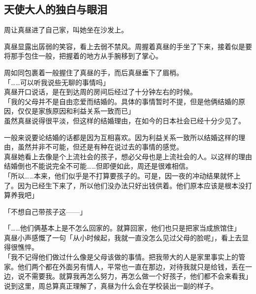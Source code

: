 \subsection{天使大人的独白与眼泪}

周让真昼进了自己家，叫她坐在沙发上。

真昼显露出孱弱的笑容，看上去弱不禁风。周握着真昼的手坐了下来，接着似是要将那手包住一般，把握着的地方从手腕移到了掌心。

周如同包裹着一般握住了真昼的手，而后真昼垂下了眉梢。\\

「……可以听我说些无聊的事情吗」\\

真昼开口说话，是在到达周的房间后经过了十分钟左右的时候。\\

「我的父母并不是自由恋爱而结婚的。具体的事情暂时不提，但是他俩结婚的原因，仅仅是家族原因和利益关系一致而已」\\

虽然真昼说得很平淡，但这样的结婚理由，在如今的日本社会已经十分少见了。

一般来说要论结婚的话都是因为互相喜欢。因为利益关系一致所以结婚这样的理由，虽然并非不可能，但还是有种在说过去的事情的感觉。\\

真昼她看上去像是个上流社会的孩子，想必父母也是上流社会的人。以这样的理由结婚倒也不能说完全不可能……但即便如此，周还是很难相信。\\

「所以……本来，他们似乎是不打算要孩子的。可是，因一夜的冲动结果就怀上了。因为已经生下来了，所以他们没办法只好出钱供着。他们原本应该是根本没打算养我吧」

「不想自己带孩子这——」

「……他们俩基本上是不怎么回家的。就算回家，他们也只是把家当成旅馆住」\\

真昼小声感慨了一句「从小时候起，我就一直没怎么见过父母的脸呢」，看上去显得很憔悴。\\

「我不记得他们做过什么像是父母该做的事情。把我带大的人是家里事实上的管家。他们两个都在外面另有情人，平常也一直在那边，对待我就只是给钱，丢在一边，说不需要我。就算我再怎么努力，再怎么做一个好孩子，他们都不会来看我」\\

说到这里，周总算真正理解了，真昼为什么会在学校装出一副的样子。\\

